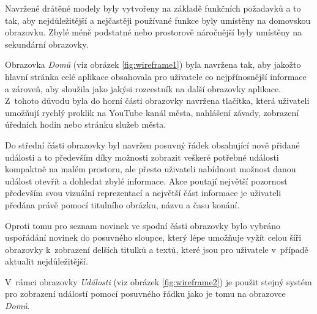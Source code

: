 
Navržené drátěné modely byly vytvořeny na základě funkčních požadavků a to tak, aby nejdůležitější a nejčastěji používané funkce byly 
umístěny na domovskou obrazovku. Zbylé méně podstatné nebo prostorově náročnější byly umístěny na sekundární obrazovky.



\pagebreak
\begin{minipage}[t]{0.45\textwidth}
  Obrazovka \textit{Domů} (viz obrázek \ref{fig:wireframe1}) byla navržena tak, aby jakožto hlavní stránka celé aplikace obsahovala pro uživatele
  co nejpřínosnější informace a zároveň, aby sloužila jako jakýsi rozcestník na další obrazovky aplikace. Z~tohoto důvodu byla do horní části obrazovky
  navržena tlačítka, která uživateli umožňují rychlý proklik na YouTube kanál města, nahlášení závady, zobrazení úředních hodin nebo stránku služeb města.
  

  Do střední části obrazovky byl navržen posuvný řádek obsahující nově přidané události a to především díky možnosti zobrazit
  veškeré potřebné události kompaktně na malém prostoru, ale přesto uživateli nabídnout možnost danou událost otevřít a dohledat zbylé informace.
  Akce poutají největší pozornost především svou vizuální reprezentací a největší část informace je uživateli předána právě pomocí titulního obrázku, názvu
  a času konání.
  
  Oproti tomu pro seznam novinek ve spodní části obrazovky bylo vybráno uspořádání novinek do posuvného sloupce, který lépe umožňuje 
  vyžít celou šíři obrazovky k~zobrazení delších titulků a textů, které jsou pro uživatele v~případě aktualit nejdůležitější.
  
  
  
  
  \bigskip
  V~rámci obrazovky \textit{Události} (viz obrázek \ref{fig:wireframe2}) je použit stejný systém pro zobrazení událostí pomocí posuvného řádku 
  jako je tomu na obrazovce \textit{Domů}.
  

\end{minipage}
